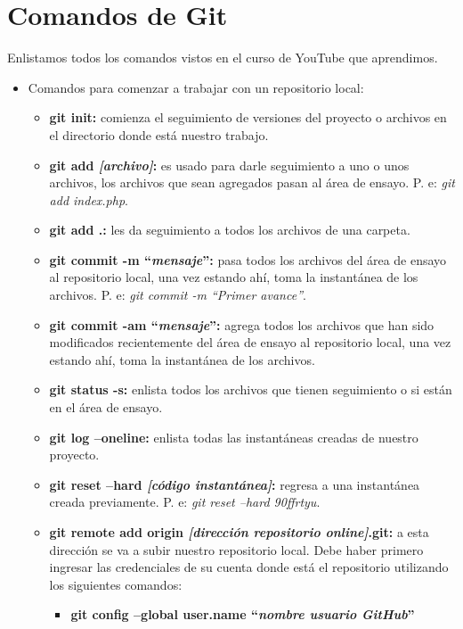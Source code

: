 \section{Comandos de Git}
\hspace{0.55cm}Enlistamos todos los comandos vistos en el curso de YouTube que aprendimos.
\begin{itemize}
    \item Comandos para comenzar a trabajar con un repositorio local:
    \begin{itemize}
        \item \textbf{git init:} comienza el seguimiento de versiones del proyecto o archivos en el directorio donde está nuestro trabajo.
        \item \textbf{git add \textit{[archivo]}:} es usado para darle seguimiento a uno o unos archivos, los archivos que sean agregados pasan al área de ensayo. P. e: \textit{git add index.php}.
        \item \textbf{git add .: }les da seguimiento a todos los archivos de una carpeta.
        \item \textbf{git commit -m “\textit{mensaje}”:} pasa todos los archivos del área de ensayo al repositorio local, una vez estando ahí, toma la instantánea de los archivos. P. e: \textit{git commit -m “Primer avance”}.
        \item \textbf{git commit -am “\textit{mensaje}”:} agrega todos los archivos que han sido modificados recientemente del área de ensayo al repositorio local, una vez estando ahí, toma la instantánea de los archivos.
        \item \textbf{git status -s:} enlista todos los archivos que tienen seguimiento o si están en el área de ensayo.
        \item \textbf{git log –oneline:} enlista todas las instantáneas creadas de nuestro proyecto.
        \item \textbf{git reset –hard \textit{[código instantánea]}:} regresa a una instantánea creada previamente. P. e: \textit{git reset –hard 90ffrtyu}.
        \item \textbf{git remote add origin \textit{[dirección repositorio online]}.git:} a esta dirección se va a subir nuestro repositorio local. Debe haber primero ingresar las credenciales de su cuenta donde está el repositorio utilizando los siguientes comandos:
        \begin{itemize}
            \item \textbf{git config –global user.name “\textit{nombre usuario GitHub}”}

\end{itemize}
\end{itemize}
\end{itemize}
